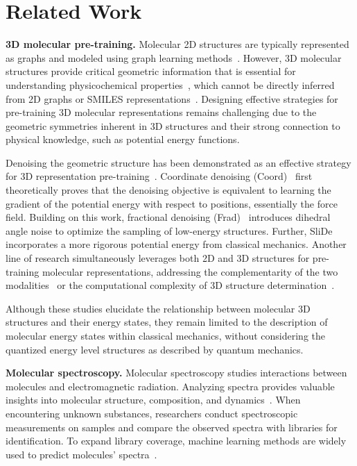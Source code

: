 \section{Related Work}

\textbf{3D molecular pre-training.}
Molecular 2D structures are typically represented as graphs and modeled using graph learning methods~\citep{MPNN,GSLB,RAGraph}. However, 3D molecular structures provide critical geometric information that is essential for understanding physicochemical properties~\citep{MolScalingLaw,MolDataPruning,Pin-Tuning,DIVE}, which cannot be directly inferred from 2D graphs or SMILES representations~\citep{TGM-DLM}. Designing effective strategies for pre-training 3D molecular representations remains challenging due to the geometric symmetries inherent in 3D structures and their strong connection to physical knowledge, such as potential energy functions.

Denoising the geometric structure has been demonstrated as an effective strategy for 3D representation pre-training~\citep{SE3-DDM,3D-EMGP,GeoTMI,Uni-Mol,MolDiffusionSurvey}. Coordinate denoising (Coord)~\citep{Coord} first theoretically proves that the denoising objective is equivalent to learning 
the gradient of the potential energy with respect to positions, essentially the force field. 
Building on this work, fractional denoising (Frad)~\citep{Frad} 
introduces dihedral angle noise to optimize the sampling of low-energy structures.
Further, SliDe~\citep{SliDe} incorporates a more rigorous potential energy from classical mechanics.
Another line of research simultaneously leverages both 2D and 3D structures for pre-training molecular representations, addressing the complementarity of the two modalities~\citep{GeomGCL,Unified23D,MoleculeSDE,MoleculeJAE,MoleBlend} or the computational complexity of 3D structure determination~\citep{GraphMVP,3D-Informax,3D-PGT}.

Although these studies elucidate the relationship between molecular 3D structures and their energy states, they remain limited to the description of molecular energy states within classical mechanics, without considering the quantized energy level structures as described by quantum mechanics.

\textbf{Molecular spectroscopy.}
Molecular spectroscopy studies interactions between molecules and electromagnetic radiation. Analyzing spectra provides valuable insights into molecular structure, composition, and dynamics~\citep{Orbitrap-Astral}. 
When encountering unknown substances, researchers conduct spectroscopic measurements on samples and compare the observed spectra with libraries for identification. To expand library coverage, machine learning methods are widely used to predict molecules' spectra~\citep{DetaNet,NEIMS,DeepGP}.

